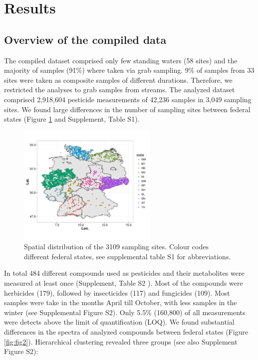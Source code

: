 \documentclass[journal=esthag,manuscript=article]{achemso}
\begin{document}

\section{Results}
\subsection{Overview of the compiled data}

The compiled dataset comprised only few standing waters (58 sites) and the majority of samples (91\%) where taken via grab sampling.  %
9\% of samples from 33 sites were taken as composite samples of different durations.
Therefore, we restricted the analyses to grab samples from streams. 
The analyzed dataset comprised 2,918,604 pesticide measurements of 42,236 samples in 3,049 sampling sites.  %
We found large differences in the number of sampling sites between federal states (Figure \ref{fig:fig1} and Supplement, Table S1).

\begin{figure}[ht]
  \includegraphics[width=0.6\textwidth]{figure1.pdf}
  \caption{Spatial distribution of the 3109 sampling sites. Colour codes different federal states, see supplemental table S1 for abbreviations.}
  \label{fig:fig1}
\end{figure}

In total 484 different compounds used as pesticides and their metabolites were measured at least once (Supplement, Table S2 ). 
Most of the compounds were herbicides (179), followed by insecticides (117) and fungicides (109).
Most samples were take in the months April till October, with less samples in the winter (see Supplemental Figure S2).
Only 5.5\% (160,800) of all measurements were detects above the limit of quantification (LOQ).
We found substantial differences in the spectra of analyzed compounds between federal states (Figure \ref{fig:fig2}).
Hierarchical clustering revealed three groups (see also Supplement Figure S2):
\end{document}
